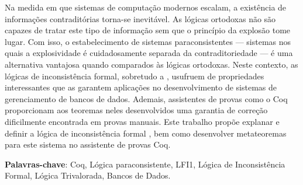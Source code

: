 
\setlength{\absparsep}{18pt} %
\begin{resumo}
    Na medida em que sistemas de computação modernos escalam, a existência de informações contraditórias torna-se inevitável. As lógicas ortodoxas não são capazes de tratar este tipo de informação sem que o princípio da explosão tome lugar. Com isso, o estabelecimento de sistemas paraconsistentes {---} sistemas nos quais a explosividade é cuidadosamente separada da contraditoriedade {---} é uma alternativa vantajosa quando comparados às lógicas ortodoxas. Neste contexto, as lógicas de inconsistência formal, sobretudo a \lfium{}, usufruem de propriedades interessantes que as garantem aplicações no desenvolvimento de sistemas de gerenciamento de bancos de dados.  Ademais, assistentes de provas como o Coq proporcionam aos teoremas neles desenvolvidos uma garantia de correção dificilmente encontrada em provas manuais. Este trabalho propõe explanar e definir a lógica de inconsistência formal \lfium{}, bem como  desenvolver metateoremas para este sistema no assistente de provas Coq.

 \textbf{Palavras-chave}: Coq, Lógica paraconsistente, LFI1, Lógica de Inconsistência Formal, Lógica Trivalorada, Bancos de Dados.
\end{resumo}
